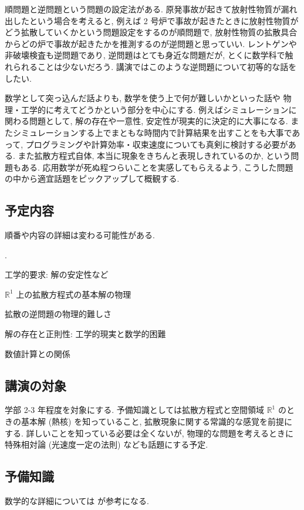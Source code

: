 \documentclass[openany, a4paper, oneside]{jsbook}
\newcounter{enum2}
\renewenvironment{enumerate}{%
\begin{list}%
{%
\arabic{enum2}.\ \,%
}%
{%
\usecounter{enum2}
\setlength{\itemindent}{0pt}%
\setlength{\leftmargin}{15pt}%
\setlength{\rightmargin}{0pt}%
\setlength{\labelsep}{0pt}%
\setlength{\labelwidth}{6pt}%
\setlength{\itemsep}{0pt}%
\setlength{\parsep}{0pt}%
\setlength{\listparindent}{0pt}%
}
}{%
\end{list}%
}
\theoremstyle{break}
\theoremstyle{breakdefn}
\begin{document}
順問題と逆問題という問題の設定法がある.
原発事故が起きて放射性物質が漏れ出したという場合を考えると,
例えば 2 号炉で事故が起きたときに放射性物質がどう拡散していくかという問題設定をするのが順問題で,
放射性物質の拡散具合からどの炉で事故が起きたかを推測するのが逆問題と思っていい.
レントゲンや非破壊検査も逆問題であり, 逆問題はとても身近な問題だが,
とくに数学科で触れられることは少ないだろう.
講演ではこのような逆問題について初等的な話をしたい.

数学として突っ込んだ話よりも, 数学を使う上で何が難しいかといった話や
物理・工学的に考えてどうかという部分を中心にする.
例えばシミュレーションに関わる問題として, 解の存在や一意性, 安定性が現実的に決定的に大事になる.
またシミュレーションする上でまともな時間内で計算結果を出すことをも大事であって,
プログラミングや計算効率・収束速度についても真剣に検討する必要がある.
また拡散方程式自体, 本当に現象をきちんと表現しきれているのか, という問題もある.
応用数学が死ぬ程つらいことを実感してもらえるよう,
こうした問題の中から適宜話題をピックアップして概観する.
\subsection{予定内容}


順番や内容の詳細は変わる可能性がある.
\begin{enumerate}
\item 工学的要求: 解の安定性など
\item $\mathbb{R}^1$ 上の拡散方程式の基本解の物理
\item 拡散の逆問題の物理的難しさ
\item 解の存在と正則性: 工学的現実と数学的困難
\item 数値計算との関係
\end{enumerate}
\subsection{講演の対象}


学部 2-3 年程度を対象にする.
予備知識としては拡散方程式と空間領域 $\mathbb{R}^1$ のときの基本解 (熱核) を知っていること,
拡散現象に関する常識的な感覚を前提にする.
詳しいことを知っている必要は全くないが,
物理的な問題を考えるときに特殊相対論 (光速度一定の法則) なども話題にする予定.
\subsection{予備知識}


数学的な詳細については \cite{Kotorin1, KimYamamoto1, NoborizakaOnishiYamamoto1} が参考になる.
\end{document}
